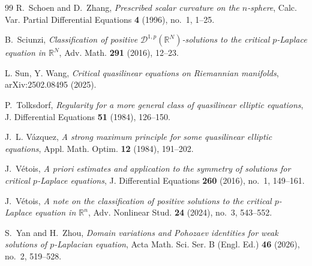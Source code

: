 \documentclass[reqno,12pt]{amsart}
\numberwithin{equation}{section}
\theoremstyle{remark}
\begin{document}
\begin{thebibliography}{99}
R.~Schoen and D.~Zhang,
\emph{Prescribed scalar curvature on the $n$-sphere},
Calc. Var. Partial Differential Equations \textbf{4} (1996), no.~1, 1--25.

B.~Sciunzi,
\emph{Classification of positive $\mathcal D^{1,p}(\mathbb R^N)$-solutions to the critical $p$-Laplace equation in $\mathbb R^N$},
Adv. Math. \textbf{291} (2016), 12--23.

L. Sun, Y. Wang, \emph{Critical quasilinear equations on Riemannian manifolds}, arXiv:2502.08495 (2025).


P.~Tolksdorf,
\emph{Regularity for a more general class of quasilinear elliptic equations},
J. Differential Equations \textbf{51} (1984), 126--150.


J.~L. V\'azquez,
\emph{A strong maximum principle for some quasilinear elliptic equations},
Appl. Math. Optim. \textbf{12} (1984), 191--202.

J.~V\'etois,
\emph{A priori estimates and application to the symmetry of solutions for critical $p$-Laplace equations},
J. Differential Equations \textbf{260} (2016), no.~1, 149--161.

J.~V\'etois,
\emph{A note on the classification of positive solutions to the critical
$p$-Laplace equation in $\mathbb R^n$},
Adv. Nonlinear Stud. \textbf{24} (2024), no.~3, 543--552.

S.~Yan and H.~Zhou,
\emph{Domain variations and Pohozaev identities for weak solutions of $p$-Laplacian equation},
Acta Math. Sci. Ser. B (Engl. Ed.) \textbf{46} (2026), no.~2, 519--528.

\end{thebibliography}
\end{document}
